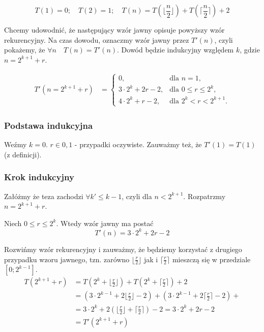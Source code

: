 \documentclass[a4paper,11pt]{article}
\begin{document}
\begin{equation}
 T(1) = 0; \quad
 T(2) = 1; \quad
 T(n) = T(\lfloor \frac{n}{2} \rfloor) + T(\lceil \frac{n}{2} \rceil) + 2
\end{equation}

Chcemy udowodnić, że następujący wzór jawny opisuje powyższy wzór rekurencyjny. Na czas dowodu, oznaczmy wzór jawny przez $T'(n)$,
czyli pokażemy, że $\forall n \quad T(n) = T'(n)$. Dowód będzie indukcyjny względem $k$, gdzie $n = 2^{k+1} + r$.

\begin{align}
 T'(n = 2^{k+1} + r) &= \begin{cases}
  0,				& \text{dla $n = 1$,}\\
  3 \cdot 2^k + 2r - 2,  	& \text{dla $0 \leq r \leq 2^k$,}\\
  4 \cdot 2^k + r - 2,       	& \text{dla $2^k < r < 2^{k+1}$.}
  \end{cases}
\end{align}

\subsubsection{Podstawa indukcyjna}
Weźmy $k = 0$. $r \in {0,1}$ - przypadki oczywiste.
Zauważmy też, że $T'(1) = T(1)$ (z definicji).

\subsubsection{Krok indukcyjny}
Załóżmy że teza zachodzi $\forall k' \leq k-1$, czyli dla $n < 2^{k+1}$. Rozpatrzmy $n = 2^{k+1} + r$.

Niech $0 \leq r \leq 2^k$. Wtedy wzór jawny ma postać
\begin{equation}
 T'(n) = 3 \cdot 2^k + 2r - 2
\end{equation}

Rozwińmy wzór rekurencyjny i zauważmy, że będziemy korzystać z drugiego przypadku wzoru jawnego, tzn. zarówno
$\lfloor \frac{r}{2} \rfloor$ jak i $\lceil \frac{r}{2} \rceil$ mieszczą się w przedziale $[0; 2^{k-1}]$.
\begin{align}
 T(2^{k+1} + r) &= T(2^k + \lfloor \frac{r}{2} \rfloor) + T(2^k + \lceil \frac{r}{2} \rceil) + 2 \\
 &= (3 \cdot 2^{k-1} + 2 \lfloor \frac{r}{2} \rfloor - 2) + (3 \cdot 2^{k-1} + 2 \lceil \frac{r}{2} \rceil - 2) +  \\
 &= 3 \cdot 2^k + 2(\lfloor \frac{r}{2} \rfloor + \lceil \frac{r}{2} \rceil) - 2 = 3 \cdot 2^k + 2r - 2 \\
 &= T'(2^{k+1} + r)
\end{align}
\end{document}
